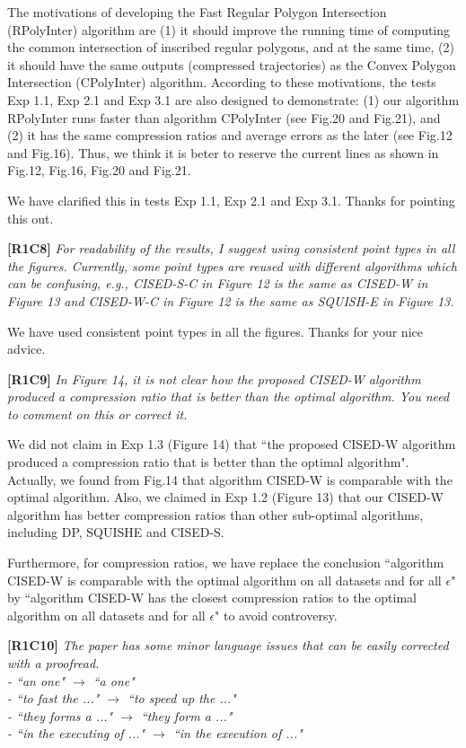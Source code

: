 \documentclass{letter}
\begin{document}
{The motivations of developing the Fast Regular Polygon Intersection (RPolyInter) algorithm are (1) it should improve the running time of computing the common intersection of inscribed regular polygons, and at the same time, (2) it should have the same outputs (compressed trajectories) as the Convex Polygon Intersection (CPolyInter) algorithm.
%
According to these motivations, the tests Exp 1.1, Exp 2.1 and Exp 3.1 are also designed to demonstrate: (1) our algorithm RPolyInter runs faster than algorithm CPolyInter (see Fig.20 and Fig.21), and (2) it has the same compression ratios and average errors as the later (see Fig.12 and Fig.16).
%
Thus, we think it is beter to reserve the current lines as shown in Fig.12, Fig.16, Fig.20 and Fig.21. %

We have clarified this in tests Exp 1.1, Exp 2.1 and Exp 3.1. Thanks for pointing this out.

\textbf{[R1C8]} \emph{For readability of the results, I suggest using consistent point types in all the figures. Currently, some point types are reused with different algorithms which can be confusing, e.g., CISED-S-C in Figure 12 is the same as CISED-W in Figure 13 and CISED-W-C in Figure 12 is the same as SQUISH-E in Figure 13.}

We have used consistent point types in all the figures. Thanks for your nice advice.

\textbf{[R1C9]} \emph{In Figure 14, it is not clear how the proposed CISED-W algorithm produced a compression ratio that is better than the optimal algorithm. You need to comment on this or correct it.}

We did not claim in Exp 1.3 (Figure 14) that ``the proposed CISED-W algorithm produced a compression ratio that is better than the optimal algorithm".
Actually, we found from Fig.14 that algorithm CISED-W is comparable with the optimal algorithm.
Also, we claimed in Exp 1.2 (Figure 13) that our CISED-W algorithm has better compression ratios than other sub-optimal algorithms, including DP, SQUISHE and CISED-S.

Furthermore, for compression ratios, we have replace the conclusion ``algorithm CISED-W is comparable with the optimal algorithm on all datasets and for all $\epsilon$" by ``algorithm CISED-W has the closest compression ratios to the optimal algorithm on all datasets and for all $\epsilon$" to avoid controversy.

\textbf{[R1C10]} \emph{The paper has some minor language issues that can be easily corrected with a proofread.\\
- ``an one" $\rightarrow$ ``a one" \\
- ``to fast the ..." $\rightarrow$ ``to speed up the ..." \\
- ``they forms a ..." $\rightarrow$ ``they form a ..."	\\
- ``in the executing of ..." $\rightarrow$ ``in the execution of ..."
}


}
\end{document}
